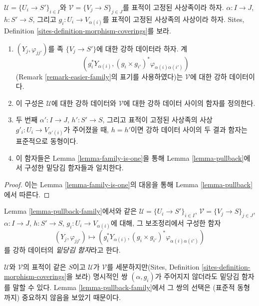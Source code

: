 \begin{lemma}
\label{lemma-pullback-family}
$\mathcal{U} = \{U_i \to S'\}_{i \in I}$와
$\mathcal{V} = \{V_j \to S\}_{j \in J}$를 표적이 고정된 사상족이라
하자. $\alpha : I \to J$, $h : S' \to S$, 그리고
$g_i : U_i \to V_{\alpha(i)}$를 표적이 고정된 사상족의 사상이라 하자.
Sites, Definition \ref{sites-definition-morphism-coverings}를 보라.
\begin{enumerate}
\item $(Y_j, \varphi_{jj'})$를 족 $\{V_j \to S'\}$에 대한 강하
데이터라 하자. 계
$$
\left(
g_i^*Y_{\alpha(i)},
(g_i \times g_{i'})^*\varphi_{\alpha(i)\alpha(i')}
\right)
$$
(Remark \ref{remark-easier-family}의 표기를 사용하였다)는
$\mathcal{V}$에 대한 강하 데이터이다.
\item 이 구성은 $\mathcal{U}$에 대한 강하 데이터와 $\mathcal{V}$에
대한 강하 데이터 사이의 함자를 정의한다.
\item 두 번째 $\alpha' : I \to J$, $h' : S' \to S$, 그리고 표적이
고정된 사상족의 사상 $g'_i : U_i \to V_{\alpha'(i)}$가 주어졌을 때,
$h = h'$이면 강하 데이터 사이의 두 결과 함자는 표준적으로 동형이다.
\item 이 함자들은 Lemma \ref{lemma-family-is-one}을 통해 Lemma
\ref{lemma-pullback}에서 구성한 밑당김 함자들과 일치한다.
\end{enumerate}
\end{lemma}

\begin{proof}
이는 Lemma \ref{lemma-family-is-one}의 대응을 통해 Lemma
\ref{lemma-pullback}에서 따른다.
\end{proof}

\begin{definition}
\label{definition-pullback-functor-family}
Lemma \ref{lemma-pullback-family}에서와 같은
$\mathcal{U} = \{U_i \to S'\}_{i \in I}$,
$\mathcal{V} = \{V_j \to S\}_{j \in J}$, $\alpha : I \to J$,
$h : S' \to S$, $g_i : U_i \to V_{\alpha(i)}$에 대해, 그 보조정리에서
구성한 함자
$$
(Y_j, \varphi_{jj'}) \longmapsto
(g_i^*Y_{\alpha(i)}, (g_i \times g_{i'})^*\varphi_{\alpha(i)\alpha(i')})
$$
를 강하 데이터의 {\it 밑당김 함자}라고 한다.
\end{definition}

\noindent
$\mathcal{U}$와 $\mathcal{V}$의 표적이 같은 $S$이고
$\mathcal{U}$가 $\mathcal{V}$를 세분하지만(Sites, Definition
\ref{sites-definition-morphism-coverings}을 보라) 명시적인 쌍
$(\alpha, g_i)$가 주어지지 않더라도 밑당김 함자를 말할 수 있다.
Lemma \ref{lemma-pullback-family}에서 그 쌍의 선택은 (표준적 동형까지)
중요하지 않음을 보았기 때문이다.


